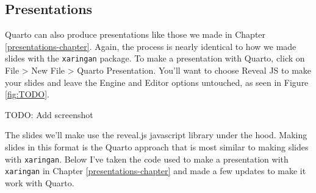 \documentclass[
]{book}
\begin{document}
\hypertarget{presentations}{%
\subsection*{Presentations}\label{presentations}}

Quarto can also produce presentations like those we made in Chapter \ref{presentations-chapter}. Again, the process is nearly identical to how we made slides with the \texttt{xaringan} package. To make a presentation with Quarto, click on File \textgreater{} New File \textgreater{} Quarto Presentation. You'll want to choose Reveal JS to make your slides and leave the Engine and Editor options untouched, as seen in Figure \ref{fig:TODO}.

TODO: Add screenshot

The slides we'll make use the reveal.js javascript library under the hood. Making slides in this format is the Quarto approach that is most similar to making slides with \texttt{xaringan}. Below I've taken the code used to make a presentation with \texttt{xaringan} in Chapter \ref{presentations-chapter} and made a few updates to make it work with Quarto.
\end{document}
